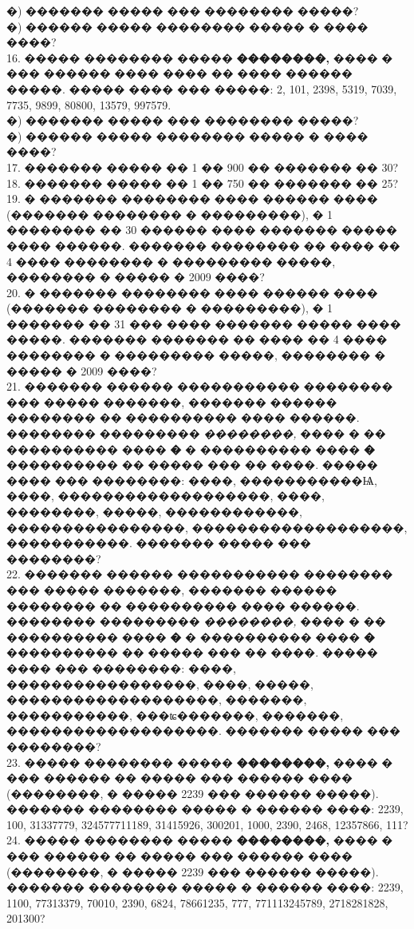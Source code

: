 \documentclass[12pt]{article}
\begin{document}
�) ������� ����� ��� �������� �����?\\
�) ������ ����� �������� ����� � ���� ����?\\
16. ����� �������� ����� {\bf ��������,} ���� � ��� ������ ���� ���� �� ���� ������ �����. ����� ���� ��� �����: 2, 101, 2398, 5319, 7039, 7735, 9899, 80800, 13579, 997579.\\
�) ������� ����� ��� �������� �����?\\
�) ������ ����� �������� ����� � ���� ����?\\
17. ������� ����� �� 1 �� 900 �� ������� �� 30?\\
18. ������� ����� �� 1 �� 750 �� ������� �� 25?\\
19. � ������� �������� ���� ������ ���� (������� �������� � ���������), � 1 �������� �� 30 ������ ���� ������� ����� ���� ������. ������� �������� �� ���� �� 4 ���� �������� � ��������� �����, �������� � ����� � 2009 ����?\\
20. � ������� �������� ���� ������ ���� (������� �������� � ���������), � 1 ������� �� 31 ��� ���� ������� ����� ���� �����. ������� ������� �� ���� �� 4 ���� �������� � ��������� �����, �������� � ����� � 2009 ����?\\
21. ������� ������ ����������� �������� ��� ����� �������, ������� ������ �������� �� ���������� ���� ������. �������� ��������� {\it ��������,} ���� � �� ���������� ���� {\bf �} � ���������� ���� {\bf �} ���������� �� ����� ��� �� ����. ����� ���� ��� ��������: ����, �����������Ѩ, ����, �������������������, ����, ��������, �����, ������������, ����������������, �������������������, �����������. ������� ����� ��� ��������?\\
22. ������� ������ ����������� �������� ��� ����� �������, ������� ������ �������� �� ���������� ���� ������. �������� ��������� {\it ��������,} ���� � �� ���������� ���� {\bf �} � ���������� ���� {\bf �} ���������� �� ����� ��� �� ����. ����� ���� ��� ��������: ����, �����������������, ����, �����, �������������������, �������, �����������, ���ʨ�������, �������, �������������������. ������� ����� ��� ��������?\\
23. ����� �������� ����� {\bf ��������,} ���� � ��� ������ �� ����� ��� ������ ���� (��������, � ����� 2239 ��� ������ �����). ������� �������� ����� � ������ ����: 2239, 100, 31337779, 324577711189, 31415926, 300201, 1000, 2390, 2468, 12357866, 111?\\
24. ����� �������� ����� {\bf ��������,} ���� � ��� ������ �� ����� ��� ������ ���� (��������, � ����� 2239 ��� ������ �����). ������� �������� ����� � ������ ����: 2239, 1100, 77313379, 70010, 2390, 6824, 78661235, 777, 771113245789, 2718281828, 201300?\\
\end{document}

